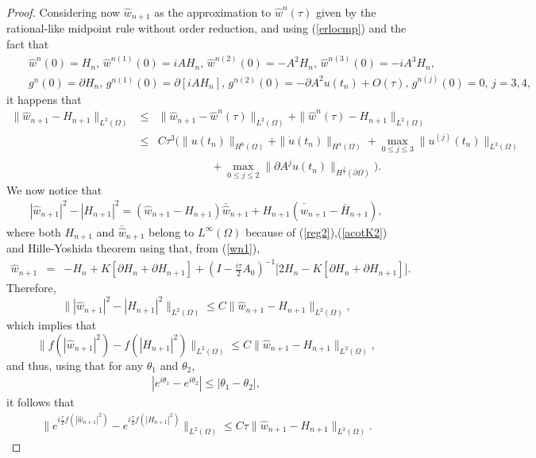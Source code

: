 \documentclass[10pt,a4paper]{amsart}
\begin{document}
\begin{proof}
Considering now $\hat{w}_{n+1}$ as the approximation to $\hat{w}^n(\tau)$ given by the rational-like midpoint rule without order reduction, and using (\ref{erlocmp}) and the fact that
\begin{eqnarray}
&&\hat{w}^n(0)=H_n, \, \hat{w}^{n(1)}(0)=i A H_n, \, \hat{w}^{n(2)}(0)=-A^2 H_n, \, \hat{w}^{n(3)}(0)=-i A^3 H_n,\nonumber \\
&&g^n(0)=\partial H_n, \,  g^{n(1)}(0)=\partial [i A H_n],
\, g^{n(2)}(0)=-\partial A^2 u(t_n)+O(\tau), \, g^{n(j)}(0)=0, \, j=3,4, \nonumber
\end{eqnarray}
it happens that
\begin{eqnarray}
\|\hat{w}_{n+1}-H_{n+1}\|_{L^2(\Omega)}&\le& \|\hat{w}_{n+1}-\hat{w}^n(\tau)\|_{L^2(\Omega)}+\|\hat{w}^n(\tau)-H_{n+1}\|_{L^2(\Omega)}
\nonumber \\
&\le & C \tau^3 (\|u(t_n)\|_{H^6(\Omega)}+\|\dot{u}(t_n)\|_{H^4(\Omega)}+\max_{0\le j \le 3} \|u^{(j)}(t_n)\|_{L^2(\Omega)}
\nonumber \\
&& \hspace{2cm}+ \max_{0\le j \le 2}\| \partial A^j u(t_n)\|_{H^{\frac{3}{2}}(\partial \Omega)}).
\label{cot1}
\end{eqnarray}
We now notice that
\begin{eqnarray}
|\hat{w}_{n+1}|^2-|H_{n+1}|^2=(\hat{w}_{n+1}-H_{n+1}) \bar{\hat{w}}_{n+1}+H_{n+1}(\bar{\hat{w}}_{n+1}-\bar{H}_{n+1}),
\label{for1}
\end{eqnarray}
where both $H_{n+1}$ and $\bar{\hat{w}}_{n+1}$ belong to $L^\infty(\Omega)$ because of (\ref{reg2}),(\ref{acotK2}) and Hille-Yoshida theorem using that, from (\ref{wn1}),
\begin{eqnarray}
\hat{w}_{n+1}&=&-H_n+K [\partial H_n+\partial H_{n+1}]+(I-\frac{i \tau}{2} A_0)^{-1}\bigg[2 H_n- K[\partial H_n+\partial H_{n+1}]\bigg].
\nonumber
\end{eqnarray}
Therefore,
$$
\| |\hat{w}_{n+1}|^2-|H_{n+1}|^2\|_{L^2(\Omega)}\le C \|\hat{w}_{n+1}-H_{n+1}\|_{L^2(\Omega)},$$
which implies that
$$
\| f(|\hat{w}_{n+1}|^2)-f(|H_{n+1}|^2)\|_{L^2(\Omega)}\le C \|\hat{w}_{n+1}-H_{n+1}\|_{L^2(\Omega)},$$
and thus, using that for any $\theta_1$ and $\theta_2$,
\begin{eqnarray}
|e^{i \theta_1}-e^{i \theta_2}|\le |\theta_1-\theta_2|,
\label{theta12}
\end{eqnarray}
it follows that
\begin{eqnarray}
\| e^{i \frac{\tau}{2}f(|\hat{w}_{n+1}|^2)}-e^{i \frac{\tau}{2}f(|H_{n+1}|^2)}\|_{L^2(\Omega)}\le C \tau \|\hat{w}_{n+1}-H_{n+1}\|_{L^2(\Omega)}.

\end{eqnarray}
\end{proof}
\end{document}
